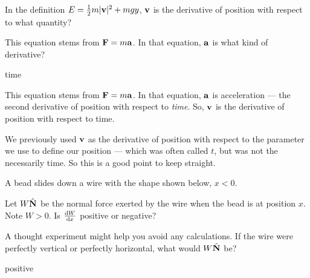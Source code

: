 \begin{question}
In the definition $E=\frac12m|\mathbf{v}|^2+mgy$,  $\mathbf{v}$ is the derivative of position with respect to what quantity?
\end{question}
\begin{hint}
	This equation stems from $\mathbf{F}=m\mathbf{a}$. In that equation, $\mathbf{a}$ is what kind of derivative?
\end{hint}
\begin{answer}
	time
\end{answer}
\begin{solution}
	This equation stems from $\mathbf{F}=m\mathbf{a}$. In that equation, $\mathbf{a}$ is acceleration --- the second derivative of position with respect to \emph{time}. So, $\mathbf{v}$ is the derivative of position with respect to time. 
	
	We previously used $\mathbf{v}$ as the derivative of position with respect to the parameter we use to define our position --- which was often called $t$, but was not the necessarily time. So this is a good point to keep straight.
\end{solution}
\begin{question}
A bead slides down a wire with the shape shown below, $x<0$.
\begin{center}
	\end{center}
Let $W\hat{\mathbf{N}}$ be the normal force exerted by the wire when the bead is at position $x$. Note $W>0$. Is $\diff{W}{x}$ positive or negative?
\end{question}
\begin{hint}
A thought experiment might help you avoid any calculations.	If the wire were perfectly vertical or perfectly horizontal, what would $W\hat{\mathbf{N}}$ be?
\end{hint}
\begin{answer}
	positive
\end{answer}
